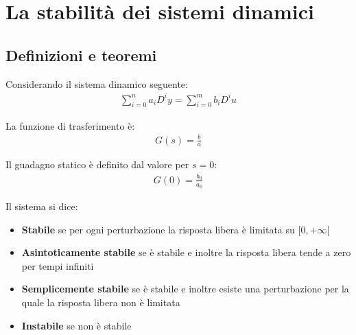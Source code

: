 \section{La stabilità dei sistemi dinamici}

\subsection{Definizioni e teoremi}

Considerando il sistema dinamico seguente:
\begin{align}
    \sum_{i=0}^{n} a_i D^i y = \sum_{i=0}^{m} b_i D^i u
\end{align}

La funzione di trasferimento è:
\begin{align}
    G(s) = \frac{b}{a}
\end{align}


Il guadagno statico è definito dal valore per $s=0$:
\begin{align}
    G(0) = \frac{b_0}{a_0}
\end{align}


\begin{definition}
    Il sistema si dice:
    \begin{itemize}
        \item \textbf{Stabile} se per ogni perturbazione la risposta libera è limitata su $[0, +\infty[$
        \item \textbf{Asintoticamente stabile} se è stabile e inoltre la risposta libera tende a zero per tempi infiniti
        \item \textbf{Semplicemente stabile} se è stabile e inoltre esiste una perturbazione per la quale la risposta libera non è limitata
        \item \textbf{Instabile} se non è stabile 
    \end{itemize}
\end{definition}


